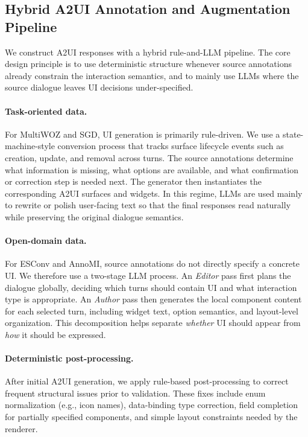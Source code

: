 \subsection{Hybrid A2UI Annotation and Augmentation Pipeline}
\label{subsec:data-pipeline}

We construct A2UI responses with a hybrid rule-and-LLM pipeline. The core design principle is to use deterministic structure whenever source annotations already constrain the interaction semantics, and to mainly use LLMs where the source dialogue leaves UI decisions under-specified.

\paragraph{Task-oriented data.}
For MultiWOZ and SGD, UI generation is primarily rule-driven. We use a state-machine-style conversion process that tracks surface lifecycle events such as creation, update, and removal across turns. The source annotations determine what information is missing, what options are available, and what confirmation or correction step is needed next. The generator then instantiates the corresponding A2UI surfaces and widgets. In this regime, LLMs are used mainly to rewrite or polish user-facing text so that the final responses read naturally while preserving the original dialogue semantics.

\paragraph{Open-domain data.}
For ESConv and AnnoMI, source annotations do not directly specify a concrete UI. We therefore use a two-stage LLM process. An \emph{Editor} pass first plans the dialogue globally, deciding which turns should contain UI and what interaction type is appropriate. An \emph{Author} pass then generates the local component content for each selected turn, including widget text, option semantics, and layout-level organization. This decomposition helps separate \emph{whether} UI should appear from \emph{how} it should be expressed.

\paragraph{Deterministic post-processing.}
After initial A2UI generation, we apply rule-based post-processing to correct frequent structural issues prior to validation. These fixes include enum normalization (e.g., icon names), data-binding type correction, field completion for partially specified components, and simple layout constraints needed by the renderer.

